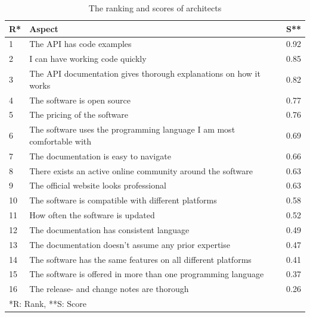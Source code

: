 \documentclass{cslthse-msc}
\begin{document}
    \begin{table}[H]
        \centering
        \caption{The ranking and scores of architects}
        \label{tab:arch}
        \begin{tabularx}{\columnwidth}{l X r}

            \textbf{R}* &  \textbf{Aspect}        & \textbf{S}** \\ \hline
            1 &    The API has code examples                                             &         0.92             \\ \hline
            2 &    I can have working code quickly                                       &         0.85             \\ \hline
            3 &    The API documentation gives thorough explanations on how it works     &         0.82             \\ \hline
            4 &    The software is open source                                           &         0.77             \\ \hline
            5 &    The pricing of the software                                           &         0.76             \\ \hline
            6 &    The software uses the programming language I am most comfortable with &         0.69             \\ \hline
            7 &    The documentation is easy to navigate                                 &         0.66             \\ \hline
            8 &    There exists an active online community around the software           &         0.63             \\ \hline
            9 &    The official website looks professional                               &         0.63             \\ \hline
            10 &    The software is compatible with different platforms                   &         0.58             \\ \hline
            11 &    How often the software is updated                                     &         0.52             \\ \hline
            12 &    The documentation has consistent language                             &         0.49             \\ \hline
            13 &    The documentation doesn't assume any prior expertise                  &         0.47             \\ \hline
            14 &    The software has the same features on all different platforms         &         0.41             \\ \hline
            15 &    The software is offered in more than one programming language         &         0.37             \\ \hline
            16 &    The release- and change notes are thorough                            &         0.26             \\ \hline \hline
            \multicolumn{3}{l}{*R: Rank, **S: Score}
        \end{tabularx}
    \end{table}
\end{document}
